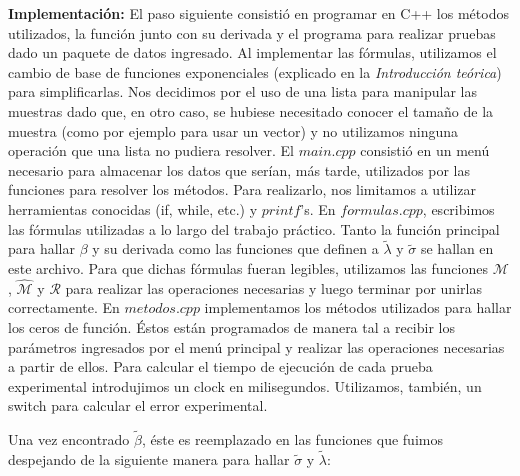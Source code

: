 \documentclass[10pt, a4paper]{article}
\newcommand{\eme}{\mathcal{M}}
\newcommand{\emeh}{\widehat{\mathcal{M}}}
\newcommand{\ere}{\mathcal{R}}
\begin{document}
\large{\textbf{Implementaci\'on:}}
El paso siguiente consistió en programar en C++ los m\'etodos utilizados, la funci\'on junto con su derivada y el programa para realizar pruebas dado un paquete de datos ingresado. Al implementar las f\'ormulas, utilizamos el cambio de base de funciones exponenciales (explicado en la \textit{Introducci\'on te\'orica}) para simplificarlas. \newline
Nos decidimos por el uso de una lista para manipular las muestras dado que, en otro caso, se hubiese necesitado conocer el tamaño de la muestra (como por ejemplo para usar un vector) y no utilizamos ninguna operaci\'on que una lista no pudiera resolver.
 \newline 
El $main.cpp$ consisti\'o en un men\'u necesario para almacenar los datos que ser\'ian, m\'as tarde, utilizados por las funciones para resolver los m\'etodos. Para realizarlo, nos limitamos a utilizar herramientas conocidas (if, while, etc.) y $printf$'s.\newline
En $formulas.cpp$, escribimos las f\'ormulas utilizadas a lo largo del trabajo pr\'actico. Tanto la funci\'on principal para hallar $\beta$ y su derivada como las funciones que definen a $\tilde{\lambda}$ y $\tilde{\sigma}$ se hallan en este archivo. Para que dichas f\'ormulas fueran legibles, utilizamos las funciones $\eme$, $\emeh$ y $\ere$ para realizar las operaciones necesarias y luego terminar por unirlas correctamente. \newline
En $metodos.cpp$ implementamos los m\'etodos utilizados para hallar los ceros de funci\'on. \'Estos est\'an programados de manera tal a recibir los par\'ametros ingresados por el men\'u principal y realizar las operaciones necesarias a partir de ellos. Para calcular el tiempo de ejecuci\'on de cada prueba experimental introdujimos un clock en milisegundos. Utilizamos, tambi\'en, un switch para calcular el error experimental.\newline

Una vez encontrado $\tilde{\beta}$, \'este es reemplazado en las funciones que fuimos despejando de la siguiente manera para hallar $\tilde{\sigma}$ y $\tilde{\lambda}$:
\end{document}
